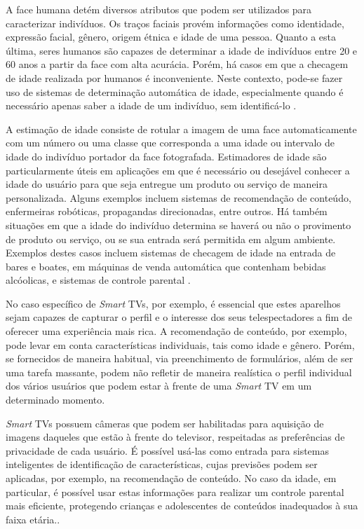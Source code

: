 
A face humana detém diversos atributos que podem ser utilizados para caracterizar indivíduos. Os traços faciais provém informações como identidade, expressão facial, gênero, origem étnica e idade de uma pessoa. Quanto a esta última, seres humanos são capazes de determinar a idade de indivíduos entre 20 e 60 anos a partir da face com alta acurácia. Porém, há casos em que a checagem de idade realizada por humanos é inconveniente. Neste contexto, pode-se fazer uso de sistemas de determinação automática de idade, especialmente quando é necessário apenas saber a idade de um indivíduo, sem identificá-lo \cite{fu2010age}.

A estimação de idade consiste de rotular a imagem de uma face automaticamente com um número ou uma classe que corresponda a uma idade ou intervalo de idade do indivíduo portador da face fotografada. Estimadores de idade são particularmente úteis em aplicações em que é necessário ou desejável conhecer a idade do usuário para que seja entregue um produto ou serviço de maneira personalizada. Alguns exemplos incluem sistemas de recomendação de conteúdo, enfermeiras robóticas, propagandas direcionadas, entre outros. Há também situações em que a idade do indivíduo determina se haverá ou não o provimento de produto ou serviço, ou se sua entrada será permitida em algum ambiente. Exemplos destes casos incluem sistemas de checagem de idade na entrada de bares e boates, em máquinas de venda automática que contenham bebidas alcóolicas, e sistemas de controle parental \cite{fu2010age}.

No caso específico de \emph{Smart} TVs, por exemplo, é essencial que estes aparelhos sejam capazes de capturar o perfil e o interesse dos seus telespectadores a fim de oferecer uma experiência mais rica. A recomendação de conteúdo, por exemplo, pode levar em conta características individuais, tais como idade e gênero. Porém, se fornecidos de maneira habitual, via preenchimento de formulários, além de ser uma tarefa massante, podem não refletir de maneira realística o perfil individual dos vários usuários que podem estar à frente de uma \emph{Smart} TV em um determinado momento.

\emph{Smart} TVs possuem câmeras que podem ser habilitadas para aquisição de imagens daqueles que estão à frente do televisor, respeitadas as preferências de privacidade de cada usuário. É possível usá-las como entrada para sistemas inteligentes de identificação de características, cujas previsões podem ser aplicadas, por exemplo, na recomendação de conteúdo. No caso da idade, em particular, é possível usar estas informações para realizar um controle parental mais eficiente, protegendo crianças e adolescentes de conteúdos inadequados à sua faixa etária.\cite{Guardian:CameraSmartv}.

